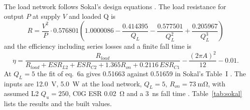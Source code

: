 \documentclass[11pt,letterpaper]{article}
\begin{document}
The load network follows Sokal's design equations \cite{sokal2001}. The load resistance for output $P$ at supply $V$ and loaded Q is
\begin{equation*}
R = \frac{V^2}{P}\cdot 0.576801\left(1.0000086-\frac{0.414395}{Q_L}-\frac{0.577501}{Q_L^2}+\frac{0.205967}{Q_L^3}\right) \tag{Sokal 6a}
\end{equation*}
and the efficiency including series losses and a finite fall time is
\begin{equation*}
\eta = \frac{R_{load}}{R_{load}+ESR_{L2}+ESR_{C2}+1.365R_{on}+0.2116\,ESR_{C1}} - \frac{(2\pi A)^2}{12} - 0.01. \tag{Sokal 2}
\end{equation*}
At $Q_L=5$ the fit of eq.~6a gives 0.51663 against 0.51659 in Sokal's Table~I \cite{projnotes}. The inputs are \SI{12.0}{\volt}, \SI{5.0}{\watt} at the load network, $Q_L=5$, $R_{on}=\SI{73}{\milli\ohm}$, with assumed L2 $Q_u=250$, C0G ESR \SI{0.02}{\ohm} and a \SI{3}{\nano\second} fall time \cite{projnotes}. Table~\ref{tab:sokal} lists the results and the built values.
\end{document}

